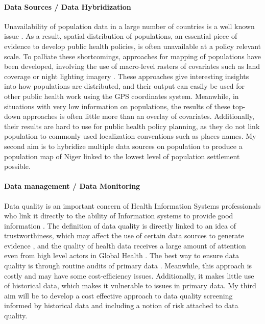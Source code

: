 \paragraph{Data Sources / Data Hybridization} Unavailability of population data in a large number of countries is a well known issue \citep{mahapatra_civil_2007,mikkelsen_global_2015}. As a result, spatial distribution of populations, an essential piece of evidence to develop public health policies, is often unavailable at a policy relevant scale. To palliate these shortcomings, approaches for mapping of populations have been developed, involving the use of macro-level rasters of covariates such as land coverage or night lighting imagery \citep{linard_population_2012,stevens_disaggregating_2015}. These approaches give interesting insights into how populations are distributed, and their output can easily be used for other public health work using the GPS coordinates system. Meanwhile, in situations with very low information on populations, the results of these top-down approaches is often little more than an overlay of covariates. Additionally, their results are hard to use for public health policy planning, as they do not link population to commonly used localization conventions such as places names. My second aim is to hybridize multiple data sources on population to produce a population map of Niger linked to the lowest level of population settlement possible.

\paragraph{Data management / Data Monitoring} Data quality is an important concern of Health Information Systems professionals \citep{shrestha_data_2000} who link it directly to the ability of Information systems to provide good information \citep{mphatswe_improving_2012}. The definition of data quality is directly linked to an idea of trustworthiness, which may affect the use of certain data sources to generate evidence \citep{gimbel_assessment_2011}, and the quality of health data receives a large amount of attention even from high level actors in Global Health \citep{abou-zahr_better_2010}. The best way to ensure data quality is through routine audits of primary data \citep{ronveaux_immunization_2005}. Meanwhile, this approach is costly and may have some cost-efficiency issues. Additionally, it makes little use of historical data, which makes it vulnerable to issues in primary data. My third aim will be to develop a cost effective approach to data quality screening informed by historical data and including a notion of risk attached to data quality.

